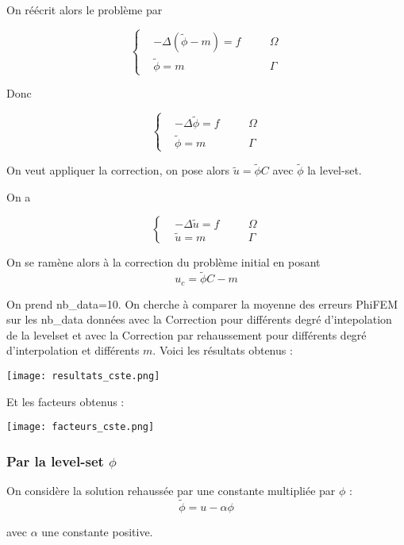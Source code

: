 On réécrit alors le problème par

$$\left\{\begin{aligned}
	&-\Delta (\tilde{\phi}-m)=f \quad &&\Omega \\
	&\tilde{\phi}=m \quad &&\Gamma
\end{aligned}\right.$$

Donc

$$\left\{\begin{aligned}
	&-\Delta \tilde{\phi}=f \quad &&\Omega \\
	&\tilde{\phi}=m \quad &&\Gamma
\end{aligned}\right.$$

On veut appliquer la correction, on pose alors $\tilde{u}=\tilde{\phi}C$
avec $\tilde{\phi}$ la level-set.

On a 

$$\left\{\begin{aligned}
	&-\Delta \tilde{u}=f \quad &&\Omega \\
	&\tilde{u}=m \quad &&\Gamma
\end{aligned}\right.$$

On se ramène alors à la correction du problème initial en posant
$$u_c = \tilde{\phi}C-m$$

On prend nb\_data=10. On cherche à comparer la moyenne des erreurs PhiFEM sur les nb\_data données avec la Correction pour différents degré d'intepolation de la levelset et avec la Correction par rehaussement pour différents degré d'interpolation et différents $m$. Voici les résultats obtenus :

\begin{minipage}{\linewidth}
	\centering
	\texttt{[image: resultats\_cste.png]}
\end{minipage}

Et les facteurs obtenus :

\begin{minipage}{\linewidth}
	\centering
	\texttt{[image: facteurs\_cste.png]}
\end{minipage}

\newpage
\subsubsection*{Par la level-set $\phi$}

On considère la solution rehaussée par une constante multipliée par $\phi$ :
$$\tilde{\phi}=u-\alpha\phi$$

avec $\alpha$ une constante positive.

